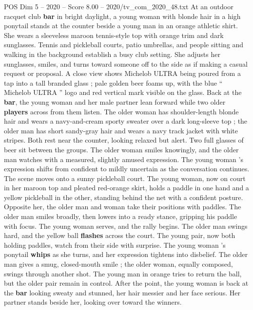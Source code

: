 \begin{textsample}{POS Dim 5 – 2020 – Score 8.00 – 2020/tv\_com\_2020\_48.txt}  \label{ex:f5_pos_065}
At an outdoor racquet club \textbf{bar} in bright daylight, a young woman with blonde hair in a high ponytail stands at the counter beside a young man in an orange athletic shirt.
She wears a sleeveless maroon tennis-style top with orange trim and dark sunglasses.
Tennis and pickleball courts, patio umbrellas, and people sitting and walking in the background establish a busy club setting.
She adjusts her sunglasses, smiles, and turns toward someone off to the side as if making a casual request or proposal.
A close view shows Michelob ULTRA being poured from a tap into a tall branded glass ; pale golden beer foams up, with the blue “ Michelob ULTRA ” logo and red vertical mark visible on the glass.
Back at the \textbf{bar}, the young woman and her male partner lean forward while two older \textbf{players} across from them listen.
The older woman has shoulder-length blonde hair and wears a navy-and-cream sporty sweater over a dark long-sleeve top ; the older man has short sandy-gray hair and wears a navy track jacket with white stripes.
Both rest near the counter, looking relaxed but alert.
Two full glasses of beer sit between the groups.
The older woman smiles knowingly, and the older man watches with a measured, slightly amused expression.
The young woman ’s expression shifts from confident to mildly uncertain as the conversation continues.
The scene moves onto a sunny pickleball court.
The young woman, now on court in her maroon top and pleated red-orange skirt, holds a paddle in one hand and a yellow pickleball in the other, standing behind the net with a confident posture.
Opposite her, the older man and woman take their positions with paddles.
The older man smiles broadly, then lowers into a ready stance, gripping his paddle with focus.
The young woman serves, and the rally begins.
The older man swings hard, and the yellow ball \textbf{flashes} across the court.
The young pair, now both holding paddles, watch from their side with surprise.
The young woman ’s ponytail \textbf{whips} as she turns, and her expression tightens into disbelief.
The older man gives a smug, closed-mouth smile ; the older woman, equally composed, swings through another shot.
The young man in orange tries to return the ball, but the older pair remain in control.
After the point, the young woman is back at the \textbf{bar} looking sweaty and stunned, her hair messier and her face serious.
Her partner stands beside her, looking over toward the winners.

\end{textsample}
